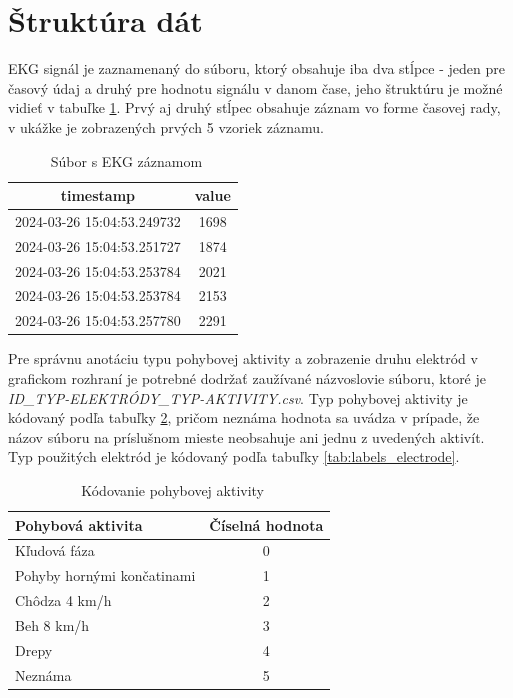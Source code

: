\section{Štruktúra dát}

EKG signál je zaznamenaný do súboru, ktorý obsahuje iba dva stĺpce - jeden pre časový údaj a druhý pre hodnotu signálu v danom čase, jeho štruktúru je možné vidieť v tabuľke \ref{tab:input}. Prvý aj druhý stĺpec obsahuje záznam vo forme časovej rady, v ukážke je zobrazených prvých 5 vzoriek záznamu.

\begin{table}[H]\centering
\caption[Súbor s EKG záznamom]{~Súbor s EKG záznamom}\label{tab:input}
    \begin{tabular}{c|c}
    	\textbf{timestamp} 	        & \textbf{value}   \tabularnewline \hline 
     	2024-03-26 15:04:53.249732  & 1698	           \tabularnewline \hline
     	2024-03-26 15:04:53.251727 	& 1874	           \tabularnewline \hline
        2024-03-26 15:04:53.253784 	& 2021	           \tabularnewline \hline
        2024-03-26 15:04:53.253784  & 2153	           \tabularnewline \hline
        2024-03-26 15:04:53.257780  & 2291	           \tabularnewline
    \end{tabular}
\end{table}

Pre správnu anotáciu typu pohybovej aktivity a zobrazenie druhu elektród v grafickom rozhraní je potrebné dodržať zaužívané názvoslovie súboru, ktoré je \textit{ID\_TYP-ELEKTRÓDY\_TYP-AKTIVITY.csv}. Typ pohybovej aktivity je kódovaný podľa tabuľky \ref{tab:labels_activity}, pričom neznáma hodnota sa uvádza v prípade, že názov súboru na príslušnom mieste neobsahuje ani jednu z uvedených aktivít. Typ použitých elektród je kódovaný podľa tabuľky \ref{tab:labels_electrode}.

\begin{table}[H]\centering
\caption[Kódovanie pohybovej aktivity]{~Kódovanie pohybovej aktivity}\label{tab:labels_activity}
    \begin{tabular}{l|c}
    	\textbf{Pohybová aktivita}  & \textbf{Číselná hodnota}    \tabularnewline \hline 
     	Kľudová fáza                & 0	                          \tabularnewline \hline
     	Pohyby hornými končatinami 	& 1	                          \tabularnewline \hline
        Chôdza 4 km/h 	            & 2	                          \tabularnewline \hline
        Beh 8 km/h                  & 3	                          \tabularnewline \hline
        Drepy                       & 4	                          \tabularnewline \hline
        Neznáma                     & 5	                          \tabularnewline
    \end{tabular}
\end{table}

